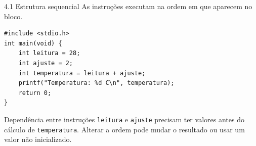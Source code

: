 \begin{frame}[fragile]{4.1 Estrutura sequencial}
As instruções executam na ordem em que aparecem no bloco.
\begin{lstlisting}
#include <stdio.h>
int main(void) {
    int leitura = 28;
    int ajuste = 2;
    int temperatura = leitura + ajuste;
    printf("Temperatura: %d C\n", temperatura);
    return 0;
}
\end{lstlisting}
\begin{block}{Dependência entre instruções}
\texttt{leitura} e \texttt{ajuste} precisam ter valores antes do cálculo de \texttt{temperatura}. Alterar a ordem pode mudar o resultado ou usar um valor não inicializado.
\end{block}
\end{frame}
